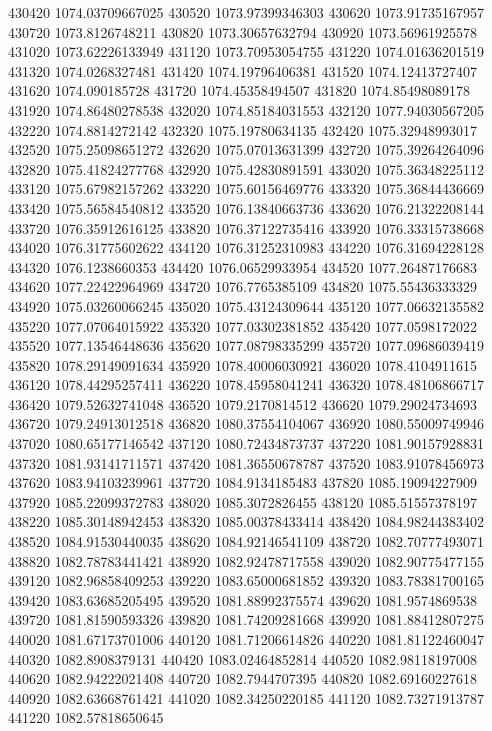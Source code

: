 {430420 1074.03709667025
430520 1073.97399346303
430620 1073.91735167957
430720 1073.8126748211
430820 1073.30657632794
430920 1073.56961925578
431020 1073.62226133949
431120 1073.70953054755
431220 1074.01636201519
431320 1074.0268327481
431420 1074.19796406381
431520 1074.12413727407
431620 1074.090185728
431720 1074.45358494507
431820 1074.85498089178
431920 1074.86480278538
432020 1074.85184031553
432120 1077.94030567205
432220 1074.8814272142
432320 1075.19780634135
432420 1075.32948993017
432520 1075.25098651272
432620 1075.07013631399
432720 1075.39264264096
432820 1075.41824277768
432920 1075.42830891591
433020 1075.36348225112
433120 1075.67982157262
433220 1075.60156469776
433320 1075.36844436669
433420 1075.56584540812
433520 1076.13840663736
433620 1076.21322208144
433720 1076.35912616125
433820 1076.37122735416
433920 1076.33315738668
434020 1076.31775602622
434120 1076.31252310983
434220 1076.31694228128
434320 1076.1238660353
434420 1076.06529933954
434520 1077.26487176683
434620 1077.22422964969
434720 1076.7765385109
434820 1075.55436333329
434920 1075.03260066245
435020 1075.43124309644
435120 1077.06632135582
435220 1077.07064015922
435320 1077.03302381852
435420 1077.0598172022
435520 1077.13546448636
435620 1077.08798335299
435720 1077.09686039419
435820 1078.29149091634
435920 1078.40006030921
436020 1078.4104911615
436120 1078.44295257411
436220 1078.45958041241
436320 1078.48106866717
436420 1079.52632741048
436520 1079.2170814512
436620 1079.29024734693
436720 1079.24913012518
436820 1080.37554104067
436920 1080.55009749946
437020 1080.65177146542
437120 1080.72434873737
437220 1081.90157928831
437320 1081.93141711571
437420 1081.36550678787
437520 1083.91078456973
437620 1083.94103239961
437720 1084.9134185483
437820 1085.19094227909
437920 1085.22099372783
438020 1085.3072826455
438120 1085.51557378197
438220 1085.30148942453
438320 1085.00378433414
438420 1084.98244383402
438520 1084.91530440035
438620 1084.92146541109
438720 1082.70777493071
438820 1082.78783441421
438920 1082.92478717558
439020 1082.90775477155
439120 1082.96858409253
439220 1083.65000681852
439320 1083.78381700165
439420 1083.63685205495
439520 1081.88992375574
439620 1081.9574869538
439720 1081.81590593326
439820 1081.74209281668
439920 1081.88412807275
440020 1081.67173701006
440120 1081.71206614826
440220 1081.81122460047
440320 1082.8908379131
440420 1083.02464852814
440520 1082.98118197008
440620 1082.94222021408
440720 1082.7944707395
440820 1082.69160227618
440920 1082.63668761421
441020 1082.34250220185
441120 1082.73271913787
441220 1082.57818650645
}
